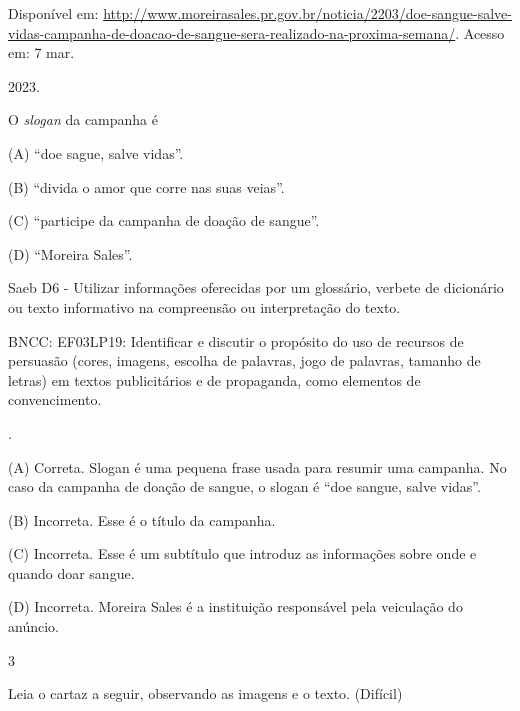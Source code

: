 \begin{itemize}
{{{\begin{itemize}
\begin{itemize}
Disponível em:
\url{http://www.moreirasales.pr.gov.br/noticia/2203/doe-sangue-salve-vidas-campanha-de-doacao-de-sangue-sera-realizado-na-proxima-semana/}.
Acesso em: 7 mar.

2023.

O \emph{slogan} da campanha é

(A) ``doe sague, salve vidas''.

(B) ``divida o amor que corre nas suas veias''.

(C) ``participe da campanha de doação de sangue''.

(D) ``Moreira Sales''.

Saeb D6 - Utilizar informações oferecidas por um glossário, verbete de
dicionário ou texto informativo na compreensão ou interpretação do
texto.

BNCC: EF03LP19: Identificar e discutir o propósito do uso de recursos de
persuasão (cores, imagens, escolha de palavras, jogo de palavras,
tamanho de letras) em textos publicitários e de propaganda, como
elementos de convencimento.

.

(A) Correta. Slogan é uma pequena frase usada para resumir uma campanha.
No caso da campanha de doação de sangue, o slogan é ``doe sangue, salve
vidas''.

(B) Incorreta. Esse é o título da campanha.

(C) Incorreta. Esse é um subtítulo que introduz as informações sobre
onde e quando doar sangue.

(D) Incorreta. Moreira Sales é a instituição responsável pela veiculação
do anúncio.

\num{3}

Leia o cartaz a seguir, observando as imagens e o texto. (Difícil)


\end{itemize}
\end{itemize}}}}
\end{itemize}

